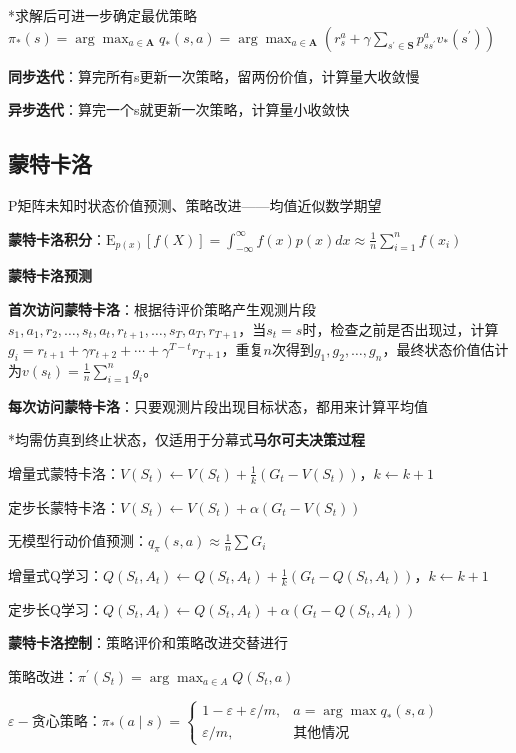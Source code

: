 	*求解后可进一步确定最优策略$\pi_{*}(s)=\arg\max_{a\in\mathbf{A}} q_{*}(s,a)=\arg\max_{a\in\mathbf{A}}\left(r_{s}^{a}+\gamma\sum_{s^{\prime}\in\mathbf{S}} p_{ss^{\prime}}^{a} v_{*}\left(s^{\prime}\right)\right)$
	
	\textbf{同步迭代}：算完所有s更新一次策略，留两份价值，计算量大收敛慢
	
	\textbf{异步迭代}：算完一个s就更新一次策略，计算量小收敛快
	
	\subsection*{蒙特卡洛}
	P矩阵未知时状态价值预测、策略改进——均值近似数学期望
	
	\textbf{蒙特卡洛积分}：$\mathrm{E}_{p(x)}[f(X)]=\int_{-\infty}^{\infty} f(x)p(x)dx\approx\frac{1}{n}\sum_{i=1}^{n} f\left(x_{i}\right)$
	
	\textbf{蒙特卡洛预测}
	
	\textbf{首次访问蒙特卡洛}：根据待评价策略产生观测片段$s_{1},a_{1},r_{2},\ldots,s_{t},a_{t},r_{t+1},\ldots,s_{T},a_{T},r_{T+1}$，当$s_{t}=s$时，检查之前是否出现过，计算$g_{i}=r_{t+1}+\gamma r_{t+2}+\cdots+\gamma^{T-t}r_{T+1}$，重复$n$次得到$g_{1},g_{2},\ldots,g_{n}$，最终状态价值估计为$v(s_{t})=\frac{1}{n}\sum_{i=1}^{n}g_{i}$。
	
	\textbf{每次访问蒙特卡洛}：只要观测片段出现目标状态，都用来计算平均值
	
	*均需仿真到终止状态，仅适用于分幕式\textbf{马尔可夫决策过程}
	
	增量式蒙特卡洛：$V(S_{t})\leftarrow V(S_{t})+\frac{1}{k}(G_{t}-V(S_{t}))$，$k\leftarrow k+1$
	
	定步长蒙特卡洛：$V(S_{t})\leftarrow V(S_{t})+\alpha(G_{t}-V(S_{t}))$
	
	无模型行动价值预测：$q_{\pi}(s,a)\approx \frac{1}{n}\sum G_{i}$
	
	增量式Q学习：$Q(S_{t},A_{t})\leftarrow Q(S_{t},A_{t})+\frac{1}{k}(G_{t}-Q(S_{t},A_{t}))$，$k\leftarrow k+1$
	
	定步长Q学习：$Q(S_{t},A_{t})\leftarrow Q(S_{t},A_{t})+\alpha(G_{t}-Q(S_{t},A_{t}))$
	
	\textbf{蒙特卡洛控制}：策略评价和策略改进交替进行
	
	策略改进：$\pi^{\prime}(S_{t})=\arg\max_{a\in A}Q(S_{t},a)$
	
	$\varepsilon-$贪心策略：$\pi_{*}(a\mid s)=\begin{cases}1-\varepsilon+\varepsilon/m, & a=\arg\max q_{*}(s,a)\\ \varepsilon/m, & \text{其他情况}\end{cases}$
	
